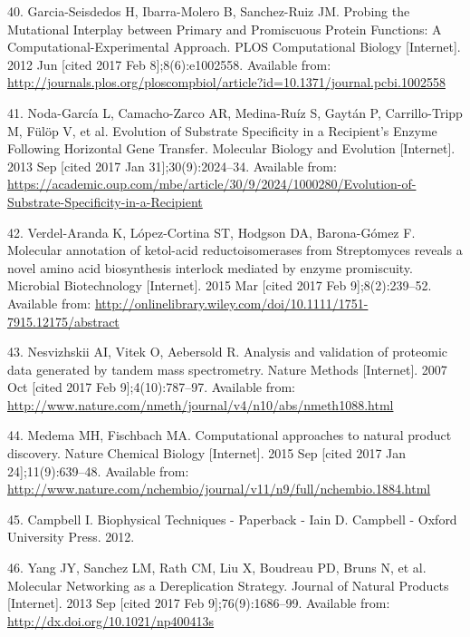 \documentclass[12pt,twoside]{reedthesis}
\begin{document}
  \hypertarget{ref-garcia-seisdedos_probing_2012}{}
  40. Garcia-Seisdedos H, Ibarra-Molero B, Sanchez-Ruiz JM. Probing the
  Mutational Interplay between Primary and Promiscuous Protein Functions:
  A Computational-Experimental Approach. PLOS Computational Biology
  {[}Internet{]}. 2012 Jun {[}cited 2017 Feb 8{]};8(6):e1002558. Available
  from:
  \url{http://journals.plos.org/ploscompbiol/article?id=10.1371/journal.pcbi.1002558}
  
  \hypertarget{ref-noda-garcia_evolution_2013}{}
  41. Noda-García L, Camacho-Zarco AR, Medina-Ruíz S, Gaytán P,
  Carrillo-Tripp M, Fülöp V, et al. Evolution of Substrate Specificity in
  a Recipient's Enzyme Following Horizontal Gene Transfer. Molecular
  Biology and Evolution {[}Internet{]}. 2013 Sep {[}cited 2017 Jan
  31{]};30(9):2024--34. Available from:
  \url{https://academic.oup.com/mbe/article/30/9/2024/1000280/Evolution-of-Substrate-Specificity-in-a-Recipient}
  
  \hypertarget{ref-verdel-aranda_molecular_2015}{}
  42. Verdel-Aranda K, López-Cortina ST, Hodgson DA, Barona-Gómez F.
  Molecular annotation of ketol-acid reductoisomerases from Streptomyces
  reveals a novel amino acid biosynthesis interlock mediated by enzyme
  promiscuity. Microbial Biotechnology {[}Internet{]}. 2015 Mar {[}cited
  2017 Feb 9{]};8(2):239--52. Available from:
  \url{http://onlinelibrary.wiley.com/doi/10.1111/1751-7915.12175/abstract}
  
  \hypertarget{ref-nesvizhskii_analysis_2007}{}
  43. Nesvizhskii AI, Vitek O, Aebersold R. Analysis and validation of
  proteomic data generated by tandem mass spectrometry. Nature Methods
  {[}Internet{]}. 2007 Oct {[}cited 2017 Feb 9{]};4(10):787--97. Available
  from:
  \url{http://www.nature.com/nmeth/journal/v4/n10/abs/nmeth1088.html}
  
  \hypertarget{ref-medema_computational_2015}{}
  44. Medema MH, Fischbach MA. Computational approaches to natural product
  discovery. Nature Chemical Biology {[}Internet{]}. 2015 Sep {[}cited
  2017 Jan 24{]};11(9):639--48. Available from:
  \url{http://www.nature.com/nchembio/journal/v11/n9/full/nchembio.1884.html}
  
  \hypertarget{ref-campbell_biophysical_2012}{}
  45. Campbell I. Biophysical Techniques - Paperback - Iain D. Campbell -
  Oxford University Press. 2012.
  
  \hypertarget{ref-yang_molecular_2013}{}
  46. Yang JY, Sanchez LM, Rath CM, Liu X, Boudreau PD, Bruns N, et al.
  Molecular Networking as a Dereplication Strategy. Journal of Natural
  Products {[}Internet{]}. 2013 Sep {[}cited 2017 Feb 9{]};76(9):1686--99.
  Available from: \url{http://dx.doi.org/10.1021/np400413s}
  
\end{document}
